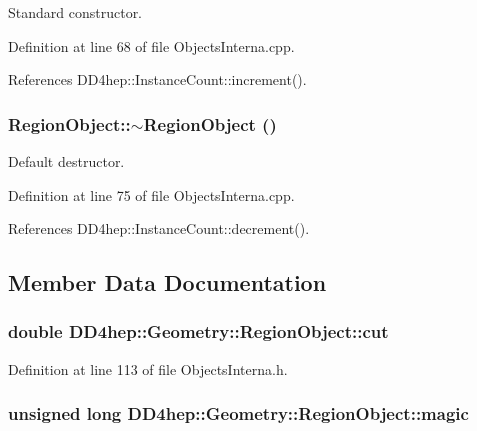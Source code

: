 Standard constructor. 

Definition at line 68 of file ObjectsInterna.cpp.

References DD4hep::InstanceCount::increment().\hypertarget{class_d_d4hep_1_1_geometry_1_1_region_object_a254eb8e472a5d43755b32b0f09be6023}{
\subsubsection[{$\sim$RegionObject}]{\setlength{\rightskip}{0pt plus 5cm}RegionObject::$\sim$RegionObject ()}}
\label{class_d_d4hep_1_1_geometry_1_1_region_object_a254eb8e472a5d43755b32b0f09be6023}


Default destructor. 

Definition at line 75 of file ObjectsInterna.cpp.

References DD4hep::InstanceCount::decrement().

\subsection{Member Data Documentation}
\hypertarget{class_d_d4hep_1_1_geometry_1_1_region_object_a6f1d69c54ce278aea8af3fbad679b0d3}{
\subsubsection[{cut}]{\setlength{\rightskip}{0pt plus 5cm}double {\bf DD4hep::Geometry::RegionObject::cut}}}
\label{class_d_d4hep_1_1_geometry_1_1_region_object_a6f1d69c54ce278aea8af3fbad679b0d3}


Definition at line 113 of file ObjectsInterna.h.\hypertarget{class_d_d4hep_1_1_geometry_1_1_region_object_aff7bdedd83403e65c3b749c759e30316}{
\subsubsection[{magic}]{\setlength{\rightskip}{0pt plus 5cm}unsigned long {\bf DD4hep::Geometry::RegionObject::magic}}}
\label{class_d_d4hep_1_1_geometry_1_1_region_object_aff7bdedd83403e65c3b749c759e30316}


